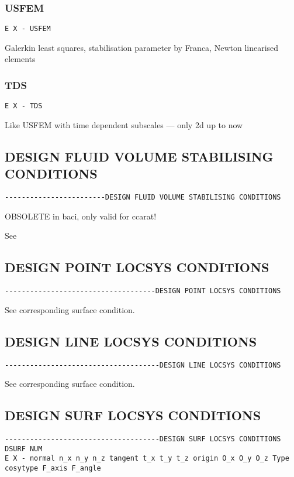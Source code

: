 \subsubsection{USFEM}

\begin{verbatim}
E X - USFEM
\end{verbatim}
Galerkin least squares, stabilisation parameter by Franca, Newton linearised elements
\subsubsection{TDS}
\begin{verbatim}
E X - TDS
\end{verbatim}
Like USFEM with time dependent subscales --- only 2d up to now

\subsection{DESIGN FLUID VOLUME STABILISING CONDITIONS}
\begin{verbatim}
------------------------DESIGN FLUID VOLUME STABILISING CONDITIONS
\end{verbatim}

OBSOLETE in baci, only valid for ccarat!

See 

\subsection{DESIGN POINT LOCSYS CONDITIONS}
\begin{verbatim}
------------------------------------DESIGN POINT LOCSYS CONDITIONS
\end{verbatim}
See corresponding surface condition.

\subsection{DESIGN LINE LOCSYS CONDITIONS}
\begin{verbatim}
-------------------------------------DESIGN LINE LOCSYS CONDITIONS
\end{verbatim}
See corresponding surface condition.

\subsection{DESIGN SURF LOCSYS CONDITIONS}
\begin{verbatim}
-------------------------------------DESIGN SURF LOCSYS CONDITIONS
DSURF NUM
E X - normal n_x n_y n_z tangent t_x t_y t_z origin O_x O_y O_z Type cosytype F_axis F_angle
\end{verbatim}

